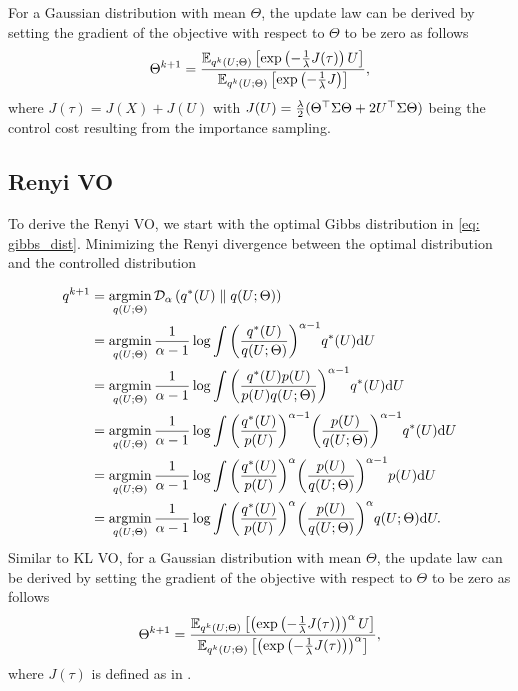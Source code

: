 \documentclass[twoside,11pt]{article}
\begin{document}
For a Gaussian distribution with mean $\Theta$, the update law can be derived by setting the gradient of the objective with respect to $\Theta$ to be zero as follows
\begin{equation}
\Theta^{k+1} = \frac{\mathbb{E}_{q^k(U;\Theta)}\left[\exp \left(-\frac{1}{\lambda}J(\tau)\right) U \right]}{\mathbb{E}_{q^k(U;\Theta)}\left[ \exp \left(-\frac{1}{\lambda}J\right)\right]},
\end{equation}
where $J(\tau)=J(X) + J(U)$ with $J(U)=\frac{\lambda}{2}(\Theta^\top\Sigma \Theta + 2U^\top\Sigma\Theta)$ being the control cost resulting from the importance sampling.

\subsection{Renyi VO}
\label{appendix: Renyi_VO}

To derive the Renyi VO, we start with the optimal Gibbs distribution in \cref{eq: gibbs_dist}. Minimizing the Renyi divergence between the optimal distribution and the controlled distribution

\begin{align}
q^{k+1}&=\argmin_{q(U;\Theta)}\D{\alpha}{q^{*}(U)}{q(U;\Theta)}\\
&= \argmin_{q(U;\Theta)}\frac{1}{\alpha-1}\log \int \bigg( \frac{q^*(U)}{q(U;\Theta)} \bigg)^{\alpha-1} q^*(U) \rd U \\
&=\argmin_{q(U;\Theta)}\frac{1}{\alpha-1}\log \int \bigg( \frac{q^*(U) p(U)}{p(U) q(U;\Theta)} \bigg)^{\alpha-1}  q^*(U) \rd U \\
&= \argmin_{q(U;\Theta)} \frac{1}{\alpha-1}\log \int \bigg( \frac{q^*(U)}{ p(U)}\bigg)^{\alpha-1} \bigg(\frac{p(U)}{ q(U;\Theta)} \bigg)^{\alpha-1}  q^*(U)\rd U \\
& =\argmin_{q(U;\Theta)} \frac{1}{\alpha-1}\log \int \bigg( \frac{q^*(U)}{ p(U)}\bigg)^{\alpha} \bigg(\frac{p(U)}{ q(U;\Theta)} \bigg)^{\alpha-1}  p(U)\rd U\\
& =\argmin_{q(U;\Theta)} \frac{1}{\alpha-1}\log \int \bigg( \frac{q^*(U)}{ p(U)}\bigg)^{\alpha} \bigg(\frac{p(U)}{ q(U;\Theta)} \bigg)^\alpha  q(U;\Theta)\rd U.
\end{align}
Similar to KL VO, for a Gaussian distribution with mean $\Theta$, the update law can be derived by setting the gradient of the objective with respect to $\Theta$ to be zero as follows
\begin{equation}
\Theta^{k+1}  =  \frac{\mathbb{E}_{q^k(U;\Theta)}\left[ \left( \exp\left(-\frac{1}{\lambda} J(\tau)\right) \right)^{\alpha} U \right]}{\mathbb{E}_{q^k(U;\Theta)}\left[\left( \exp\left(-\frac{1}{\lambda} J(\tau)\right) \right)^{\alpha} \right]},
\end{equation}
where $J(\tau)$ is defined as in .
\end{document}
